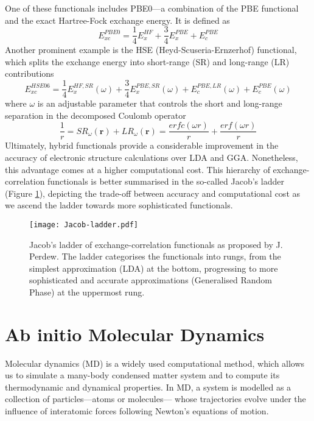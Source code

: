 One of these functionals includes PBE0\supercite{Heyd2003}---a combination of the PBE functional and the exact Hartree-Fock exchange energy. It is defined as 
\begin{equation}
  \label{eq66}
  E_{xc}^{PBE0} = \frac{1}{4}E_{x}^{HF} + \frac{3}{4}E_{x}^{PBE} + E_{c}^{PBE}
\end{equation}
Another prominent example is the HSE (Heyd-Scuseria-Ernzerhof) functional\supercite{Moussa2012}, which splits the exchange energy into short-range (SR) and long-range (LR) contributions
\begin{equation}
  \label{eq67}
  E_{xc}^{HSE06} = \frac{1}{4}E_{x}^{HF,SR}(\omega) + \frac{3}{4}E_{x}^{PBE,SR}(\omega) + E_{c}^{PBE,LR}(\omega) + E_{c}^{PBE}(\omega)
  \end{equation}
  where $\omega$ is an adjustable parameter that controls the short and long-range separation in the decomposed Coulomb operator
  \begin{equation}
    \label{eq68}
    \frac{1}{r} = SR_{\omega}(\mathbf{r}) + LR_{\omega}(\mathbf{r}) = 
    \frac{erfc(\omega r)}{r} + \frac{erf(\omega r)}{r}
  \end{equation}
Ultimately, hybrid functionals provide a considerable improvement in the accuracy of electronic structure calculations over LDA and GGA. Nonetheless, this advantage comes at a higher computational cost. This hierarchy of exchange-correlation functionals is better summarised in the so-called Jacob's ladder\supercite{Perdew2001} (Figure \ref{fig:jacob-ladder}), depicting the trade-off between accuracy and computational cost as we ascend the ladder towards more sophisticated functionals. 
\begin{figure}[H]
  \centering
  \texttt{[image: Jacob-ladder.pdf]}
  \caption{Jacob's ladder of exchange-correlation functionals as proposed by J. Perdew\supercite{Perdew2001}. The ladder categorises the functionals into rungs, from the simplest approximation (LDA) at the bottom, progressing to more sophisticated and accurate approximations (Generalised Random Phase) at the uppermost rung.  
  }
  \label{fig:jacob-ladder}
\end{figure}


\section{Ab initio Molecular Dynamics} 
Molecular dynamics (MD)\supercite{marx2009ab, Kuhne2014} is a widely used computational method, which allows us to simulate a many-body condensed matter system and to compute its thermodynamic and dynamical properties. In MD, a system is modelled as a collection of particles---atoms or molecules--- whose trajectories evolve under the influence of interatomic forces following Newton's equations of motion. 


